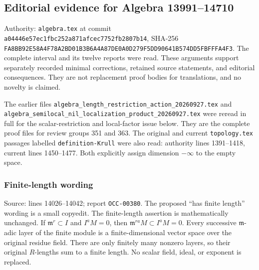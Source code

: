 \subsection{Editorial evidence for Algebra 13991--14710}\label{algebra-proof-003-editorial-evidence-for-algebra-1399114710}

Authority: \texttt{algebra.tex} at commit \texttt{a044\allowbreak{}46e5\allowbreak{}7ec1\allowbreak{}fbc2\allowbreak{}52a8\allowbreak{}71af\allowbreak{}cec7\allowbreak{}752f\allowbreak{}b280\allowbreak{}7b14}, SHA-256 \texttt{FA8B\allowbreak{}B92E\allowbreak{}58A4\allowbreak{}F78A\allowbreak{}2BD0\allowbreak{}1B3B\allowbreak{}6A4A\allowbreak{}87DE\allowbreak{}0A0D\allowbreak{}279F\allowbreak{}5DD9\allowbreak{}0641\allowbreak{}B574\allowbreak{}DD5F\allowbreak{}BFFF\allowbreak{}A4F3}. The complete interval and its twelve reports were read. These arguments support separately recorded minimal corrections, retained source statements, and editorial consequences. They are not replacement proof bodies for translations, and no novelty is claimed.

The earlier files \texttt{algebra\_\allowbreak{}length\_\allowbreak{}restriction\_\allowbreak{}action\_\allowbreak{}20260927.\allowbreak{}tex} and \texttt{algebra\_\allowbreak{}semilocal\_\allowbreak{}nil\_\allowbreak{}localization\allowbreak{}\_\allowbreak{}product\_\allowbreak{}20260927.\allowbreak{}tex} were reread in full for the scalar-restriction and local-factor issue below. They are the complete proof files for review groups 351 and 363. The original and current \texttt{topology.tex} passages labelled \texttt{definition-Krull} were also read: authority lines 1391--1418, current lines 1450--1477. Both explicitly assign dimension \(-\infty\) to the empty space.

\subsubsection{Finite-length wording}\label{algebra-proof-003-finite-length-wording}

Source: lines 14026--14042; report \texttt{OCC-00380}. The proposed ``has finite length'' wording is a small copyedit. The finite-length assertion is mathematically unchanged. If \(\mathfrak m^r\subset I\) and \(I^aM=0\), then \(\mathfrak m^{ra}M\subset I^aM=0\). Every successive \(\mathfrak m\)-adic layer of the finite module is a finite-dimensional vector space over the original residue field. There are only finitely many nonzero layers, so their original \(R\)-lengths sum to a finite length. No scalar field, ideal, or exponent is replaced.

